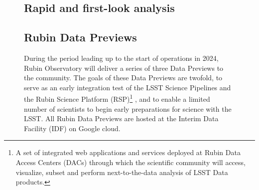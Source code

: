 \begin{figure}[!ht]
\subsection{Rapid and first-look analysis} \label{ssec:rapid}

\subsection{Rubin Data Previews} \label{ssec:datapreviews}

During the period leading up to the start of operations in 2024, Rubin Observatory will deliver a series of three Data Previews to the community. 
The goals of these Data Previews are twofold, to serve as an early integration test of the LSST Science Pipelines and the Rubin Science Platform (RSP)\footnote{A set of integrated web applications and services deployed at Rubin Data Access Centers (DACs) through which the scientific community will access, visualize, subset and perform next-to-the-data analysis of LSST Data products.} \cite{lse-319}, and to enable a limited number of scientists to begin early preparations for science with the LSST.
All  Rubin Data Previews are hosted at the Interim Data Facility (IDF) on Google cloud\cite{2021arXiv211115030O}.


\end{figure}
